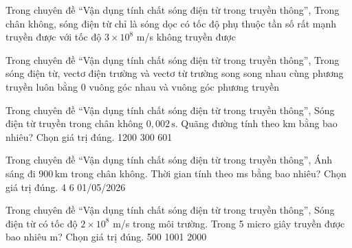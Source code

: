 \begin{ex}
Trong chuyên đề “Vận dụng tính chất sóng điện từ trong truyền thông”, Trong chân không, sóng điện từ
\choice
{chỉ là sóng dọc}
{có tốc độ phụ thuộc tần số rất mạnh}
{\True truyền được với tốc độ $3\times10^8$ m/s}
{không truyền được}
\end{ex}

\begin{ex}
Trong chuyên đề “Vận dụng tính chất sóng điện từ trong truyền thông”, Trong sóng điện từ, vectơ điện trường và vectơ từ trường
\choice
{song song nhau}
{cùng phương truyền}
{luôn bằng 0}
{\True vuông góc nhau và vuông góc phương truyền}
\end{ex}

\begin{ex}
Trong chuyên đề “Vận dụng tính chất sóng điện từ trong truyền thông”, Sóng điện từ truyền trong chân không $0,002\,\text{s}$. Quãng đường tính theo km bằng bao nhiêu? Chọn giá trị đúng.
\choice
{}
{1200}
{300}
{601}
\end{ex}

\begin{ex}
Trong chuyên đề “Vận dụng tính chất sóng điện từ trong truyền thông”, Ánh sáng đi $900\,\text{km}$ trong chân không. Thời gian tính theo ms bằng bao nhiêu? Chọn giá trị đúng.
\choice
{4}
{}
{6}
{01/05/2026}
\end{ex}

\begin{ex}
Trong chuyên đề “Vận dụng tính chất sóng điện từ trong truyền thông”, Sóng điện từ có tốc độ $2\times10^8$ m/s trong môi trường. Trong 5 micro giây truyền được bao nhiêu m? Chọn giá trị đúng.
\choice
{500}
{1001}
{}
{2000}
\end{ex}

